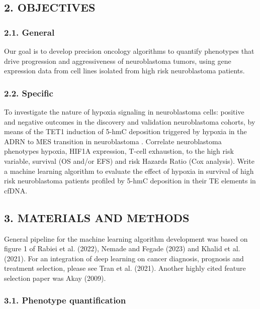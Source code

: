 \documentclass[
]{article}
\begin{document}
\hypertarget{objectives}{%
\subsection{2. OBJECTIVES}\label{objectives}}

\hypertarget{general}{%
\subsubsection{2.1. General}\label{general}}

Our goal is to develop precision oncology algorithms to quantify
phenotypes that drive progression and aggressiveness of neuroblastoma
tumors, using gene expression data from cell lines isolated from high
risk neuroblastoma patients.

\hypertarget{specific}{%
\subsubsection{2.2. Specific}\label{specific}}

To investigate the nature of hypoxia signaling in neuroblastoma cells:
positive and negative outcomes in the discovery and validation
neuroblastoma cohorts, by means of the TET1 induction of 5-hmC
deposition triggered by hypoxia in the ADRN to MES transition in
neuroblastoma . Correlate neuroblastoma phenotypes hypoxia, HIF1A
expression, T-cell exhaustion, to the high risk variable, survival (OS
and/or EFS) and risk Hazards Ratio (Cox analysis). Write a machine
learning algorithm to evaluate the effect of hypoxia in survival of high
risk neuroblastoma patients profiled by 5-hmC deposition in their TE
elements in cfDNA.

\hypertarget{materials-and-methods}{%
\subsection{3. MATERIALS AND METHODS}\label{materials-and-methods}}

General pipeline for the machine learning algorithm development was
based on figure 1 of Rabiei et al. (2022), Nemade and Fegade (2023) and
Khalid et al. (2021). For an integration of deep learning on cancer
diagnosis, prognosis and treatment selection, please see Tran et al.
(2021). Another highly cited feature selection paper was Akay (2009).

\hypertarget{phenotype-quantification}{%
\subsubsection{3.1. Phenotype
quantification}\label{phenotype-quantification}}
\end{document}
